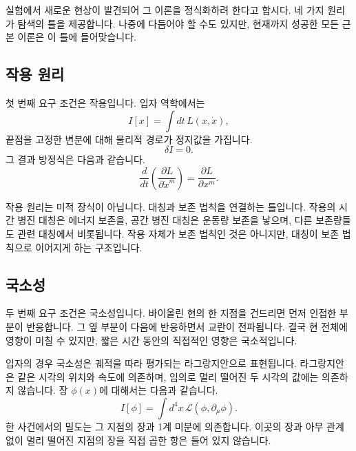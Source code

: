 실험에서 새로운 현상이 발견되어 그 이론을 정식화하려 한다고 합시다. 네 가지 원리가 탐색의 틀을 제공합니다. 나중에 다듬어야 할 수도 있지만, 현재까지 성공한 모든 근본 이론은 이 틀에 들어맞습니다.

\subsection{작용 원리}

첫 번째 요구 조건은 작용입니다. 입자 역학에서는
\begin{equation}
I[x]
=
\int dt\,L(x,\dot x),
\label{eq:sr7-particle-action-general}
\end{equation}
끝점을 고정한 변분에 대해 물리적 경로가 정지값을 가집니다.
\begin{equation}
\delta I=0.
\end{equation}
그 결과 방정식은 다음과 같습니다.
\begin{equation}
\frac{d}{dt}
\left(
\frac{\partial L}{\partial\dot x^m}
\right)
=
\frac{\partial L}{\partial x^m}.
\label{eq:sr7-EL}
\end{equation}

작용 원리는 미적 장식이 아닙니다. 대칭과 보존 법칙을 연결하는 틀입니다. 작용의 시간 병진 대칭은 에너지 보존을, 공간 병진 대칭은 운동량 보존을 낳으며, 다른 보존량들도 관련 대칭에서 비롯됩니다. 작용 자체가 보존 법칙인 것은 아니지만, 대칭이 보존 법칙으로 이어지게 하는 구조입니다.

\subsection{국소성}

두 번째 요구 조건은 국소성입니다. 바이올린 현의 한 지점을 건드리면 먼저 인접한 부분이 반응합니다. 그 옆 부분이 다음에 반응하면서 교란이 전파됩니다. 결국 현 전체에 영향이 미칠 수 있지만, 짧은 시간 동안의 직접적인 영향은 국소적입니다.

입자의 경우 국소성은 궤적을 따라 평가되는 라그랑지안으로 표현됩니다. 라그랑지안은 같은 시각의 위치와 속도에 의존하며, 임의로 멀리 떨어진 두 시각의 값에는 의존하지 않습니다. 장 \(\phi(x)\)에 대해서는 다음과 같습니다.
\begin{equation}
I[\phi]
=
\int d^4x\,
\mathcal L\!\left(\phi,\partial_\mu\phi\right).
\label{eq:sr7-local-field-action}
\end{equation}
한 사건에서의 밀도는 그 지점의 장과 1계 미분에 의존합니다. 이곳의 장과 아무 관계 없이 멀리 떨어진 지점의 장을 직접 곱한 항은 들어 있지 않습니다.

